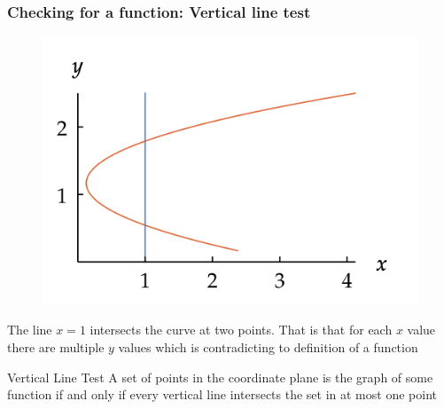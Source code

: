 \documentclass{beamer}
\begin{document}
\begin{frame}
  \frametitle{Checking for a function: Vertical line test}
  \begin{figure}[h]    
  \centering
  \includegraphics[scale=0.5]{not-fn.png}
  \end{figure}
  \pause
  The line  \(x=1\) intersects the curve at two points. That is that for each \(x\) value there are multiple \(y\) values which is contradicting to definition of a function 
  \begin{block}{Vertical Line Test}
    A set of points in the coordinate plane is the graph of some function if and only if every vertical line intersects the set in at most one point
    
  \end{block}
\end{frame} 
\end{document}
